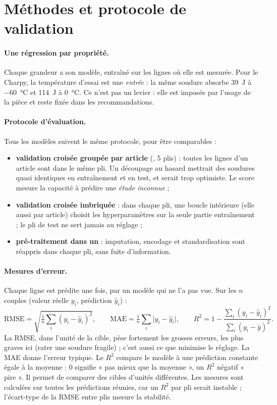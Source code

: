 \section{Méthodes et protocole de validation}

\paragraph{Une régression par propriété.} Chaque grandeur a son modèle, entraîné sur
les lignes où elle est mesurée. Pour le Charpy, la température d'essai est une
\emph{entrée} : la même soudure absorbe \SI{39}{\joule} à \SI{-60}{\celsius} et
\SI{114}{\joule} à \SI{0}{\celsius}. Ce n'est pas un levier : elle est imposée par
l'usage de la pièce et reste fixée dans les recommandations.

\paragraph{Protocole d'évaluation.}\label{sec:f-protocole} Tous les modèles suivent le
même protocole, pour être comparables \cite{hastie2009,pedregosa2011} :
\begin{itemize}
  \item \textbf{validation croisée groupée par article} (, 5 plis) :
    toutes les lignes d'un article sont dans le même pli. Un découpage au hasard
    mettrait des soudures quasi identiques en entraînement et en test, et serait trop
    optimiste. Le score mesure la capacité à prédire une \emph{étude inconnue} ;
  \item \textbf{validation croisée imbriquée} \cite{varma2006} : dans chaque pli, une
    boucle intérieure (elle aussi par article) choisit les hyperparamètres sur la seule
    partie entraînement ; le pli de test ne sert jamais au réglage ;
  \item \textbf{pré-traitement dans un } : imputation, encodage et
    standardisation sont réappris dans chaque pli, sans fuite d'information.
\end{itemize}

\paragraph{Mesures d'erreur.} Chaque ligne est prédite une fois, par un modèle qui ne l'a
pas vue. Sur les $n$ couples (valeur réelle $y_i$, prédiction $\hat y_i$) :
\[
  \mathrm{RMSE} = \sqrt{\tfrac{1}{n}\textstyle\sum_i (y_i - \hat y_i)^2}, \qquad
  \mathrm{MAE} = \tfrac{1}{n}\textstyle\sum_i \lvert y_i - \hat y_i \rvert, \qquad
  R^2 = 1 - \dfrac{\sum_i (y_i - \hat y_i)^2}{\sum_i (y_i - \bar y)^2}.
\]
La RMSE, dans l'unité de la cible, pèse fortement les grosses erreurs, les plus graves
ici (rater une soudure fragile) ; c'est aussi ce que minimise le réglage. La MAE donne
l'erreur typique. Le $R^2$ compare le modèle à une prédiction constante égale à la
moyenne : 0 signifie « pas mieux que la moyenne », un $R^2$ négatif « pire ». Il permet
de comparer des cibles d'unités différentes. Les mesures sont calculées sur toutes les
prédictions réunies, car un $R^2$ par pli serait instable ; l'écart-type de la RMSE entre
plis mesure la stabilité.

